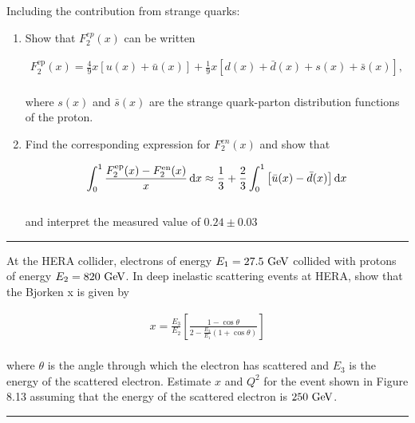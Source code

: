 \begin{problem}{8.7}
    Including the contribution from strange quarks:

    \begin{enumerate}[label=(\alph*)]
        \item Show that $F_2^{ep}(x)$ can be written 
        
        \begin{align*}
            F_2^{\text{ep}}(x) = \frac{4}{9} x \left[ u(x) + \bar{u}(x) \right] + \frac{1}{9} x \left[ d(x) + \bar{d}(x) + s(x) + \bar{s}(x) \right],
        \end{align*}\\
        where $s(x)$ and $\bar{s}(x)$ are the strange quark-parton distribution functions of the proton.
        \item Find the corresponding expression for $F_2^{en}(x)$ and show that
        
        \begin{align*}
            \int_0^1 \frac{F^{\text{ep}}_2(x)-F^{\text{en}}_2(x)}{x} \mathop{}\!\mathrm{d} x \approx \frac{1}{3} + \frac{2}{3} \int_0^1 \left[ \bar{u}(x) - \bar{d}(x) \right] \mathop{}\!\mathrm{d} x
        \end{align*}\\
        and interpret the measured value of $0.24\pm 0.03$
    \end{enumerate}
\end{problem}
\begin{solution}

\end{solution}

\noindent\rule{7in}{1.5pt}


\begin{problem}{8.8}
At the HERA collider, electrons of energy $E_1 = 27.5 \text{ GeV}$ collided with protons of energy $E_2 = 820 \text{ GeV}$. In deep inelastic scattering events at HERA, show that the Bjorken x is given by

\begin{align*}
    x = \frac{E_3}{E_2} \left[ \frac{1-\cos\theta}{2-\frac{E_3}{E_1}\left(1+\cos\theta\right)} \right]
\end{align*}\\
where $\theta$ is the angle through which the electron has scattered and $E_3$ is the energy of the scattered electron. Estimate $x$ and $Q^2$ for the event shown in Figure 8.13 assuming that the energy of the scattered electron is $250 \text{ GeV}$.
\end{problem}
\begin{solution}

\end{solution}

\noindent\rule{7in}{1.5pt}

